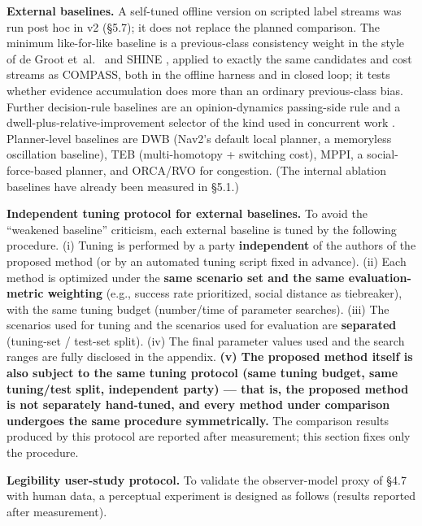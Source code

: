 \documentclass[11pt]{article}
\begin{document}
\textbf{External baselines.} A self-tuned offline version on scripted label streams was run post hoc in v2 (\S5.7); it does not replace the planned comparison. The minimum like-for-like baseline is a previous-class consistency weight in the style of de Groot et~al.~\cite{degroot2024topology} and SHINE \cite{martinezbaselga2026shine}, applied to exactly the same candidates and cost streams as COMPASS, both in the offline harness and in closed loop; it tests whether evidence accumulation does more than an ordinary previous-class bias. Further decision-rule baselines are an opinion-dynamics passing-side rule \cite{cathcart2023opinion} and a dwell-plus-relative-improvement selector of the kind used in concurrent work \cite{li2026bigcbf}. Planner-level baselines are DWB (Nav2's default local planner, a memoryless oscillation baseline), TEB (multi-homotopy + switching cost), MPPI, a social-force-based planner, and ORCA/RVO for congestion. (The internal ablation baselines have already been measured in \S5.1.)

\textbf{Independent tuning protocol for external baselines.} To avoid the ``weakened baseline'' criticism, each external baseline is tuned by the following procedure. (i) Tuning is performed by a party \textbf{independent} of the authors of the proposed method (or by an automated tuning script fixed in advance). (ii) Each method is optimized under the \textbf{same scenario set and the same evaluation-metric weighting} (e.g., success rate prioritized, social distance as tiebreaker), with the same tuning budget (number/time of parameter searches). (iii) The scenarios used for tuning and the scenarios used for evaluation are \textbf{separated} (tuning-set / test-set split). (iv) The final parameter values used and the search ranges are fully disclosed in the appendix. \textbf{(v) The proposed method itself is also subject to the same tuning protocol (same tuning budget, same tuning/test split, independent party) --- that is, the proposed method is not separately hand-tuned, and every method under comparison undergoes the same procedure symmetrically.} The comparison results produced by this protocol are reported after measurement; this section fixes only the procedure.

\textbf{Legibility user-study protocol.} To validate the observer-model proxy of \S4.7 with human data, a perceptual experiment is designed as follows (results reported after measurement).
\end{document}

